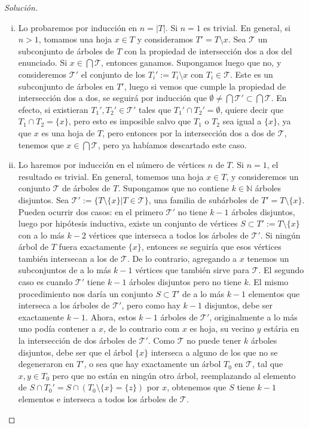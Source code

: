 \documentclass[12pt]{report}
\theoremstyle{plain}
\theoremstyle{definition}
\newenvironment{solution}{\begin{proof}[Solución]}{\end{proof}}
\newcommand{\naturals}{\mathbb{N}}
\newcommand{\abs}[1]{\left \vert #1 \right \vert}
\begin{document}
\begin{solution}
\begin{enumerate}[(i)]
\item Lo probaremos por inducción en $n = \abs T$. Si $n = 1$ es trivial. En general, si $n>1$, tomamos una hoja $x \in T$ y consideramos $T' = T \setminus x$. Sea $\mathcal T$ un subconjunto de árboles de $T$ con la propiedad de intersección dos a dos del enunciado. Si $x \in \bigcap \mathcal T$, entonces ganamos. Supongamos luego que no, y consideremos $\mathcal T '$ el conjunto de los $T_i' := T_i \setminus x$ con $T_i \in \mathcal T$. Este es un subconjunto de árboles en $T'$, luego si vemos que cumple la propiedad de intersección dos a dos, se seguirá por inducción que $\emptyset \neq \bigcap \mathcal T ' \subset \bigcap \mathcal T$. En efecto, si existieran $T_1', T_2' \in \mathcal T'$ tales que $T_1' \cap T_2' = \emptyset$, quiere decir que $T_1 \cap T_2 = \{x\}$, pero esto es imposible salvo que $T_1$ o  $T_2$ sea igual a $\{ x \}$, ya que $x$ es una hoja de $T$, pero entonces por la intersección dos a dos de $\mathcal T$, tenemos que $x \in \bigcap \mathcal T$, pero ya habíamos descartado este caso.
\item Lo haremos por inducción en el número de vértices $n$ de $T$. Si $n = 1$, el resultado es trivial. En
general, tomemos una hoja $x \in T$, y consideremos un conjunto $\mathcal T$ de árboles de $T$. Supongamos que no
contiene $k \in \naturals$ árboles disjuntos. Sea $\mathcal T ' := \{ T \setminus \{x \} | T \in \mathcal T \}$, una familia de subárboles de $T' = T \setminus \{x\}$.
Pueden ocurrir dos casos: en el primero $\mathcal T'$ no tiene $k-1$ árboles disjuntos, luego por hipótesis
inductiva, existe un conjunto de vértices $S \subset T' := T \setminus \{x\}$ con a lo más $k-2$ vértices que
interseca a todos los árboles de $\mathcal T'$. Si ningún árbol de $T$ fuera exactamente $\{x\}$, entonces se
seguiría que esos vértices también intersecan a los de $\mathcal T$. De lo contrario, agregando a $x$ tenemos
un subconjuntos de a lo más $k-1$ vértices que también sirve para $\mathcal T$. El segundo caso es cuando $\mathcal T '$ tiene $k-1$ árboles disjuntos pero no tiene $k$. El mismo procedimiento nos daría un conjunto $S \subset T'$ de a lo más $k-1$ elementos que interseca a los árboles de $\mathcal T'$, pero como hay $k-1$ disjuntos, debe ser exactamente $k-1$. Ahora, estos $k-1$ árboles de $\mathcal T'$, originalmente a lo más uno podía contener a $x$, de lo contrario com $x$ es hoja, su vecino $y$ estária en la intersección de dos árboles de $\mathcal T '$. Como $\mathcal T$ no puede tener $k$ árboles disjuntos, debe ser que el árbol $\{x\}$ interseca a alguno de los que no se degeneraron en $T'$, o sea que hay exactamente un árbol $T_0$ en $\mathcal T$, tal que $x,y \in T_0$ pero que no están en ningún otro árbol, reemplazando al elemento de $S \cap T_0' = S \cap (T_0 \setminus \{x\} = \{z\})$ por $x$, obtenemos que $S$ tiene $k-1$ elementos e interseca a todos los árboles de $\mathcal T$.
\end{enumerate}
\end{solution}
\end{document}
